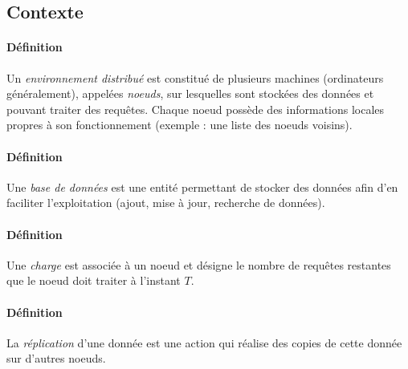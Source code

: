 \documentclass[12pt]{article}
\begin{document}
\subsection{Contexte}

\paragraph{Définition} Un \textit{environnement distribué} est constitué de plusieurs machines (ordinateurs généralement), appelées \textit{noeuds}, sur lesquelles sont stockées des données et pouvant traiter des requêtes. Chaque noeud possède des informations locales propres à son fonctionnement (exemple : une liste des noeuds voisins).

\paragraph{Définition} Une \textit{base de données} est une entité permettant de stocker des données afin d'en faciliter l'exploitation (ajout, mise à jour, recherche de données).





\paragraph{Définition} Une \textit{charge} est associée à un noeud et désigne le nombre de requêtes restantes que le noeud doit traiter à l'instant $T$.

\paragraph{Définition} La \textit{réplication} d'une donnée est une action qui réalise des copies de cette donnée sur d'autres noeuds.
\end{document}
